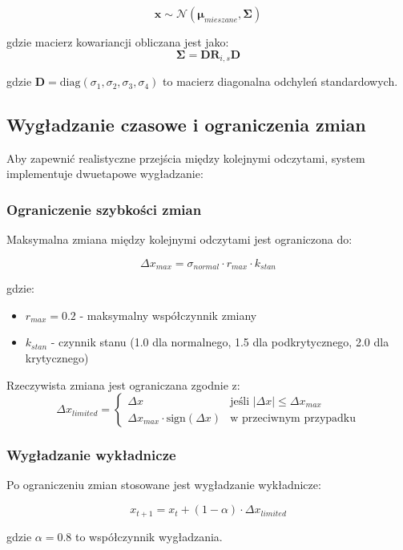 $$\mathbf{x} \sim \mathcal{N}(\boldsymbol{\mu}_{mieszane}, \boldsymbol{\Sigma})$$

gdzie macierz kowariancji obliczana jest jako:
$$\boldsymbol{\Sigma} = \mathbf{D} \mathbf{R}_{i,s} \mathbf{D}$$

gdzie $\mathbf{D} = \text{diag}(\sigma_1, \sigma_2, \sigma_3, \sigma_4)$ to macierz diagonalna odchyleń standardowych.

\subsection{Wygładzanie czasowe i ograniczenia zmian}
\label{subsec:wygladzanie_czasowe}

Aby zapewnić realistyczne przejścia między kolejnymi odczytami, system implementuje dwuetapowe wygładzanie:

\subsubsection{Ograniczenie szybkości zmian}

Maksymalna zmiana między kolejnymi odczytami jest ograniczona do:

$$\Delta x_{max} = \sigma_{normal} \cdot r_{max} \cdot k_{stan}$$

gdzie:
\begin{itemize}
    \item $r_{max} = 0.2$ - maksymalny współczynnik zmiany
    \item $k_{stan}$ - czynnik stanu (1.0 dla normalnego, 1.5 dla podkrytycznego, 2.0 dla krytycznego)
\end{itemize}

Rzeczywista zmiana jest ograniczana zgodnie z:
$$\Delta x_{limited} = \begin{cases}
\Delta x & \text{jeśli } |\Delta x| \leq \Delta x_{max} \\
\Delta x_{max} \cdot \text{sign}(\Delta x) & \text{w przeciwnym przypadku}
\end{cases}$$

\subsubsection{Wygładzanie wykładnicze}

Po ograniczeniu zmian stosowane jest wygładzanie wykładnicze:

$$x_{t+1} = x_t + (1-\alpha) \cdot \Delta x_{limited}$$

gdzie $\alpha = 0.8$ to współczynnik wygładzania.

